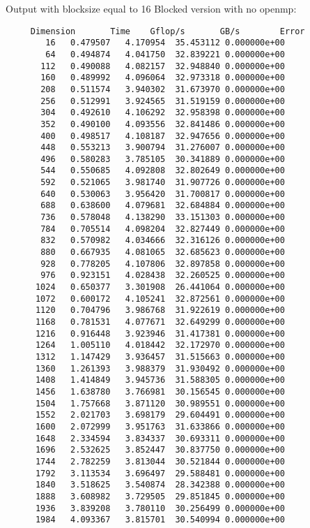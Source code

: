 \documentclass{article}
\begin{document}
Output with blocksize equal to 16
Blocked version with no openmp:
\begin{verbatim}
     Dimension       Time    Gflop/s       GB/s        Error
        16   0.479507   4.170954  35.453112 0.000000e+00
        64   0.494874   4.041750  32.839221 0.000000e+00
       112   0.490088   4.082157  32.948840 0.000000e+00
       160   0.489992   4.096064  32.973318 0.000000e+00
       208   0.511574   3.940302  31.673970 0.000000e+00
       256   0.512991   3.924565  31.519159 0.000000e+00
       304   0.492610   4.106292  32.958398 0.000000e+00
       352   0.490100   4.093556  32.841486 0.000000e+00
       400   0.498517   4.108187  32.947656 0.000000e+00
       448   0.553213   3.900794  31.276007 0.000000e+00
       496   0.580283   3.785105  30.341889 0.000000e+00
       544   0.550685   4.092808  32.802649 0.000000e+00
       592   0.521065   3.981740  31.907726 0.000000e+00
       640   0.530063   3.956420  31.700817 0.000000e+00
       688   0.638600   4.079681  32.684884 0.000000e+00
       736   0.578048   4.138290  33.151303 0.000000e+00
       784   0.705514   4.098204  32.827449 0.000000e+00
       832   0.570982   4.034666  32.316126 0.000000e+00
       880   0.667935   4.081065  32.685623 0.000000e+00
       928   0.778205   4.107806  32.897858 0.000000e+00
       976   0.923151   4.028438  32.260525 0.000000e+00
      1024   0.650377   3.301908  26.441064 0.000000e+00
      1072   0.600172   4.105241  32.872561 0.000000e+00
      1120   0.704796   3.986768  31.922619 0.000000e+00
      1168   0.781531   4.077671  32.649299 0.000000e+00
      1216   0.916448   3.923946  31.417381 0.000000e+00
      1264   1.005110   4.018442  32.172970 0.000000e+00
      1312   1.147429   3.936457  31.515663 0.000000e+00
      1360   1.261393   3.988379  31.930492 0.000000e+00
      1408   1.414849   3.945736  31.588305 0.000000e+00
      1456   1.638780   3.766981  30.156545 0.000000e+00
      1504   1.757668   3.871120  30.989551 0.000000e+00
      1552   2.021703   3.698179  29.604491 0.000000e+00
      1600   2.072999   3.951763  31.633866 0.000000e+00
      1648   2.334594   3.834337  30.693311 0.000000e+00
      1696   2.532625   3.852447  30.837750 0.000000e+00
      1744   2.782259   3.813044  30.521844 0.000000e+00
      1792   3.113534   3.696497  29.588481 0.000000e+00
      1840   3.518625   3.540874  28.342388 0.000000e+00
      1888   3.608982   3.729505  29.851845 0.000000e+00
      1936   3.839208   3.780110  30.256499 0.000000e+00
      1984   4.093367   3.815701  30.540994 0.000000e+00
\end{verbatim}
\end{document}
